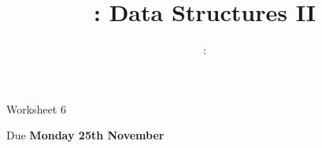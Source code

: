\usepackage{../../beamerthemeFalmouthGamesAcademy}
\usepackage{multimedia}
\graphicspath{ {../../} }

\lstset{language=[Sharp]C
}

\usepackage[normalem]{ulem}
\usepackage{wasysym}

\usepackage{algpseudocode}

\usepackage{pdfpages}

\usetikzlibrary{arrows,automata}
\usetikzlibrary{tikzmark,calc}




\title{\sessionnumber: Data Structures II}
\subtitle{\modulecode: \moduletitle}

\frame{\titlepage} 

\begin{frame}{Worksheet 6}
    \begin{center}
        Due \textbf{Monday 25th November}
    \end{center}
\end{frame}




%

